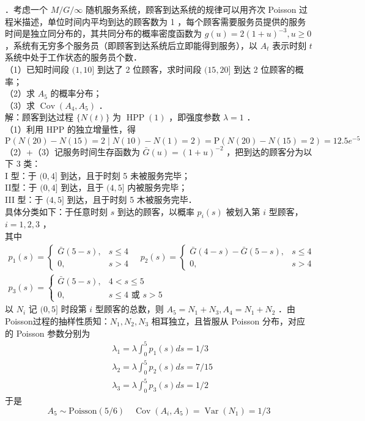 \documentclass[UTF8]{ctexart}
\begin{document}
．考虑一个 $M / G / \infty$ 随机服务系统，顾客到达系统的规律可以用齐次 Poisson 过程米描述，单位时间内平均到达的顾客数为 1 ，每个顾客需要服务员提供的服务时间是独立同分布的，其共同分布的概率密度函数为 $g(u)=2(1+u)^{-3}, u \geq 0$ ，系统有无穷多个服务员（即顾客到达系统后立即能得到服务），以 $A_{t}$ 表示时刻 $t$ 系统中处于工作状态的服务员个数．\\
（1）已知时间段 $(1,10]$ 到达了 2 位顾客，求时间段 $(15,20]$ 到达 2 位顾客的概率；\\
（2）求 $A_{5}$ 的概率分布；\\
（3）求 $\operatorname{Cov}\left(A_{4}, A_{5}\right)$ ．\\
解：顾客到达过程 $\{N(t)\}$ 为 $\operatorname{HPP}(1)$ ，即强度参数 $\lambda=1$ ．\\
（1）利用 HPP 的独立增量性，得
$$
\mathrm{P}(N(20)-N(15)=2 \mid N(10)-N(1)=2)=\mathrm{P}(N(20)-N(15)=2)=12.5 e^{-5}
$$
（2）+（3）记服务时间生存函数为 $\bar{G}(u)=(1+u)^{-2}$ ，把到达的顾客分为以下 3 类：\\
I 型：于 $(0,4]$ 到达，且于时刻 5 未被服务完毕；\\
II型：于 $(0,4]$ 到达，且于 $(4,5]$ 内被服务完毕；\\
III 型：于 $(4,5]$ 到达，且于时刻 5 木被服务完毕．\\
具体分类如下：于任意时刻 $s$ 到达的顾客，以概率 $p_{i}(s)$ 被划入第 $i$ 型顾客，$i=1,2,3$ ，\\
其中
$$
\begin{gathered}
	p_{1}(s)=\left\{\begin{array}{ll}
		\bar{G}(5-s), & s \leq 4 \\
		0, & s>4
	\end{array} \quad p_{2}(s)= \begin{cases}\bar{G}(4-s)-\bar{G}(5-s), & s \leq 4 \\
		0, & s>4\end{cases} \right. \\
	p_{3}(s)= \begin{cases}\bar{G}(5-s), & 4<s \leq 5 \\
		0, & s \leq 4 \text { 或 } s>5\end{cases}
\end{gathered}
$$
以 $N_{i}$ 记 $(0,5]$ 时段第 $i$ 型顾客的总数，则 $A_{5}=N_{1}+N_{3}, A_{4}=N_{1}+N_{2}$ ．由 Poisson过程的抽样性质知：$N_{1}, N_{2}, N_{3}$ 相耳独立，且皆服从 Poisson 分布，对应的 Poisson 参数分别为
$$
\begin{aligned}
	& \lambda_{1}=\lambda \int_{0}^{5} p_{1}(s) d s=1 / 3 \\
	& \lambda_{2}=\lambda \int_{0}^{5} p_{2}(s) d s=7 / 15 \\
	& \lambda_{3}=\lambda \int_{0}^{5} p_{3}(s) d s=1 / 2
\end{aligned}
$$
于是 $$A_{5} \sim \operatorname{Poisson(5/6)} \quad  \operatorname{Cov}\left(A_{i}, A_{5}\right)=\operatorname{Var}\left(N_{1}\right)=1 / 3$$\\
\end{document}
